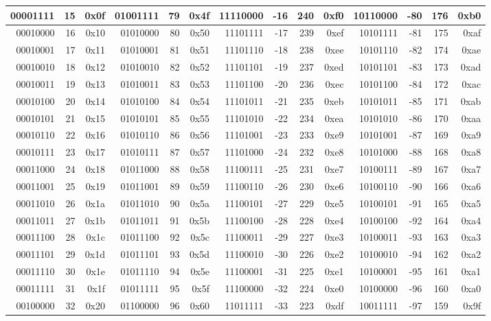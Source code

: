 \begin{center}
{\begin{tabular}{| rrr | rrr | rrrr | rrrr |}
			00001111 & 15 & 0x0f & 01001111 & 79 & 0x4f & 11110000 & -16 & 240 & 0xf0 & 10110000 & -80 & 176 & 0xb0 \\
			\hline
			00010000 & 16 & 0x10 & 01010000 & 80 & 0x50 & 11101111 & -17 & 239 & 0xef & 10101111 & -81 & 175 & 0xaf \\
			00010001 & 17 & 0x11 & 01010001 & 81 & 0x51 & 11101110 & -18 & 238 & 0xee & 10101110 & -82 & 174 & 0xae \\
			00010010 & 18 & 0x12 & 01010010 & 82 & 0x52 & 11101101 & -19 & 237 & 0xed & 10101101 & -83 & 173 & 0xad \\
			00010011 & 19 & 0x13 & 01010011 & 83 & 0x53 & 11101100 & -20 & 236 & 0xec & 10101100 & -84 & 172 & 0xac \\
			00010100 & 20 & 0x14 & 01010100 & 84 & 0x54 & 11101011 & -21 & 235 & 0xeb & 10101011 & -85 & 171 & 0xab \\
			00010101 & 21 & 0x15 & 01010101 & 85 & 0x55 & 11101010 & -22 & 234 & 0xea & 10101010 & -86 & 170 & 0xaa \\
			00010110 & 22 & 0x16 & 01010110 & 86 & 0x56 & 11101001 & -23 & 233 & 0xe9 & 10101001 & -87 & 169 & 0xa9 \\
			00010111 & 23 & 0x17 & 01010111 & 87 & 0x57 & 11101000 & -24 & 232 & 0xe8 & 10101000 & -88 & 168 & 0xa8 \\
			\hline
			00011000 & 24 & 0x18 & 01011000 & 88 & 0x58 & 11100111 & -25 & 231 & 0xe7 & 10100111 & -89 & 167 & 0xa7 \\
			00011001 & 25 & 0x19 & 01011001 & 89 & 0x59 & 11100110 & -26 & 230 & 0xe6 & 10100110 & -90 & 166 & 0xa6 \\
			00011010 & 26 & 0x1a & 01011010 & 90 & 0x5a & 11100101 & -27 & 229 & 0xe5 & 10100101 & -91 & 165 & 0xa5 \\
			00011011 & 27 & 0x1b & 01011011 & 91 & 0x5b & 11100100 & -28 & 228 & 0xe4 & 10100100 & -92 & 164 & 0xa4 \\
			00011100 & 28 & 0x1c & 01011100 & 92 & 0x5c & 11100011 & -29 & 227 & 0xe3 & 10100011 & -93 & 163 & 0xa3 \\
			00011101 & 29 & 0x1d & 01011101 & 93 & 0x5d & 11100010 & -30 & 226 & 0xe2 & 10100010 & -94 & 162 & 0xa2 \\
			00011110 & 30 & 0x1e & 01011110 & 94 & 0x5e & 11100001 & -31 & 225 & 0xe1 & 10100001 & -95 & 161 & 0xa1 \\
			00011111 & 31 & 0x1f & 01011111 & 95 & 0x5f & 11100000 & -32 & 224 & 0xe0 & 10100000 & -96 & 160 & 0xa0 \\
			\hline
			00100000 & 32 & 0x20 & 01100000 & 96 & 0x60 & 11011111 & -33 & 223 & 0xdf & 10011111 & -97 & 159 & 0x9f \\

\end{tabular}}
\end{center}
